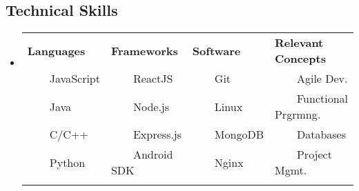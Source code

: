 \documentclass[10pt,a4paper]{article}
\newcommand{\tabitem}{~~\llap{--}~~}
\newenvironment{indentsection}[1]%
{\begin{list}{}%
	{\setlength{\leftmargin}{1.7#1}}%
	\item[]%
}
{\end{list}}
\begin{document}
\subsection*{Technical Skills}

\vspace{-0.2em}

\begin{itemize}[leftmargin=*]
	\parskip=0.1em	

\item[]

\begin{tabularx}{\textwidth}{X X X X}

\textbf{Languages} & \textbf{Frameworks} & \textbf{Software} & \textbf{Relevant Concepts}\\
\tabitem JavaScript & \tabitem ReactJS & \tabitem Git & \tabitem Agile Dev. \\
\tabitem Java & \tabitem Node.js & \tabitem Linux & \tabitem Functional Prgrmng. \\	
\tabitem C/C++ & \tabitem Express.js  & \tabitem MongoDB & \tabitem Databases \\
\tabitem Python & \tabitem Android SDK & \tabitem Nginx & \tabitem Project Mgmt. \\
\\




\end{tabularx}

\end{itemize}
\end{document}
